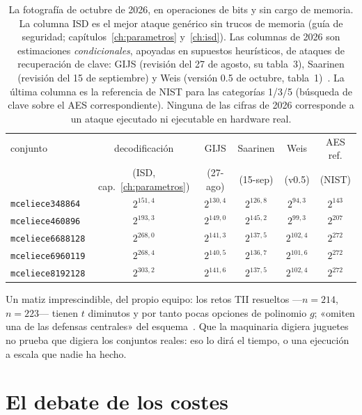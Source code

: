\documentclass[11pt,a4paper,oneside]{report}
\begin{document}
\begin{table}[htbp]
\centering
\footnotesize
\setlength{\tabcolsep}{6pt}
\begin{tabular}{lccccc}
\toprule
conjunto & decodificación & GIJS & Saarinen & Weis &
AES ref.\\
 & (ISD, cap.~\ref{ch:parametros}) & (27-ago) & (15-sep) & (v0.5) & (NIST)\\
\midrule
\texttt{mceliece348864} & $2^{151{,}4}$ & $2^{130{,}4}$ & $2^{126{,}8}$ & $2^{94{,}3}$ & $2^{143}$\\
\texttt{mceliece460896} & $2^{193{,}3}$ & $2^{149{,}0}$ & $2^{145{,}2}$ & $2^{99{,}3}$ & $2^{207}$\\
\texttt{mceliece6688128} & $2^{268{,}0}$ & $2^{141{,}3}$ & $2^{137{,}5}$ & $2^{102{,}4}$ & $2^{272}$\\
\texttt{mceliece6960119} & $2^{268{,}4}$ & $2^{140{,}5}$ & $2^{136{,}7}$ & $2^{101{,}6}$ & $2^{272}$\\
\texttt{mceliece8192128} & $2^{303{,}2}$ & $2^{141{,}6}$ & $2^{137{,}5}$ & $2^{102{,}4}$ & $2^{272}$\\
\bottomrule
\end{tabular}
\caption{La fotografía de octubre de 2026, en operaciones de bits y
sin cargo de memoria. La columna ISD es el mejor ataque genérico sin
trucos de memoria (guía de seguridad; capítulos~\ref{ch:parametros}
y~\ref{ch:isd}). Las columnas de 2026 son estimaciones
\emph{condicionales}, apoyadas en supuestos heurísticos, de ataques
de recuperación de clave: GIJS (revisión del 27 de agosto, su
tabla~3), Saarinen (revisión del 15 de septiembre) y Weis (versión
0.5 de octubre, tabla~1)~\cite{ghoshal2026,saarinen2026a,weis2026}.
La última columna es la referencia de NIST para las categorías
1/3/5 (búsqueda de clave sobre el AES correspondiente). Ninguna de
las cifras de 2026 corresponde a un ataque ejecutado ni ejecutable
en hardware real.}
\label{tab:2026-costes}
\end{table}

Un matiz imprescindible, del propio equipo: los retos TII resueltos
---$n=214$, $n=223$--- tienen $t$ diminutos y por tanto pocas
opciones de polinomio $g$; «omiten una de las defensas centrales»
del esquema~\cite{cm610}. Que la maquinaria digiera juguetes no
prueba que digiera los conjuntos reales: eso lo dirá el tiempo, o
una ejecución a escala que nadie ha hecho.

\section{El debate de los costes}\label{sec:2026-costes}
\end{document}
